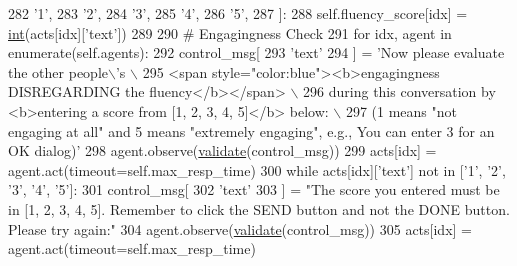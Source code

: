 \begin{DoxyCode}
282                             \textcolor{stringliteral}{'1'},
283                             \textcolor{stringliteral}{'2'},
284                             \textcolor{stringliteral}{'3'},
285                             \textcolor{stringliteral}{'4'},
286                             \textcolor{stringliteral}{'5'},
287                         ]:
288                             self.fluency\_score[idx] = \hyperlink{namespacelanguage__model_1_1eval__ppl_a7d12ee00479673c5c8d1f6d01faa272a}{int}(acts[idx][\textcolor{stringliteral}{'text'}])
289 
290                     \textcolor{comment}{# Engagingness Check}
291                     \textcolor{keywordflow}{for} idx, agent \textcolor{keywordflow}{in} enumerate(self.agents):
292                         control\_msg[
293                             \textcolor{stringliteral}{'text'}
294                         ] = \textcolor{stringliteral}{'Now please evaluate the other people\(\backslash\)'s \(\backslash\)}
295 \textcolor{stringliteral}{                                              <span style="color:blue"><b>engagingness DISREGARDING the
       fluency</b></span> \(\backslash\)}
296 \textcolor{stringliteral}{                                              during this conversation by <b>entering a score from [1, 2,
       3, 4, 5]</b> below: \(\backslash\)}
297 \textcolor{stringliteral}{                                               (1 means "not engaging at all" and 5 means "extremely
       engaging", e.g., You can enter 3 for an OK dialog)'}
298                         agent.observe(\hyperlink{namespaceparlai_1_1core_1_1worlds_afc3fad603b7bce41dbdc9cdc04a9c794}{validate}(control\_msg))
299                         acts[idx] = agent.act(timeout=self.max\_resp\_time)
300                         \textcolor{keywordflow}{while} acts[idx][\textcolor{stringliteral}{'text'}] \textcolor{keywordflow}{not} \textcolor{keywordflow}{in} [\textcolor{stringliteral}{'1'}, \textcolor{stringliteral}{'2'}, \textcolor{stringliteral}{'3'}, \textcolor{stringliteral}{'4'}, \textcolor{stringliteral}{'5'}]:
301                             control\_msg[
302                                 \textcolor{stringliteral}{'text'}
303                             ] = \textcolor{stringliteral}{"The score you entered must be in [1, 2, 3, 4, 5]. Remember to click the
       SEND button and not the DONE button. Please try again:"}
304                             agent.observe(\hyperlink{namespaceparlai_1_1core_1_1worlds_afc3fad603b7bce41dbdc9cdc04a9c794}{validate}(control\_msg))
305                             acts[idx] = agent.act(timeout=self.max\_resp\_time)

\end{DoxyCode}
